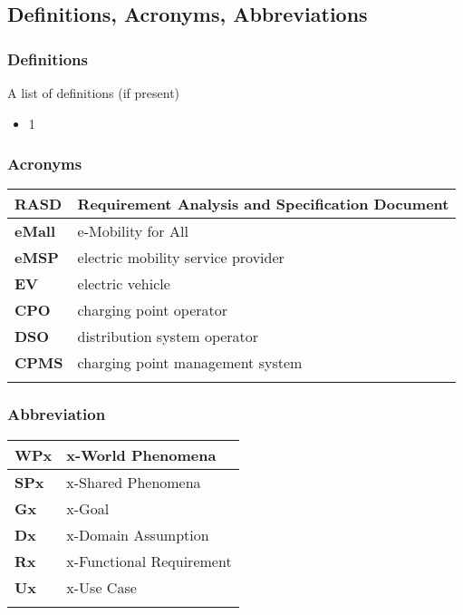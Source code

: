 \subsection{Definitions, Acronyms, Abbreviations}
\subsubsection*{Definitions}
A list of definitions (if present)
\begin{itemize}
    \item 1
\end{itemize}
\subsubsection*{Acronyms}
\begin{table}[h]
    \begin{tabular}{|l|l|}
        \toprule
        \textbf{RASD}  & Requirement Analysis and Specification Document \\ \midrule
        \textbf{eMall} & e-Mobility for All                              \\ \midrule
        \textbf{eMSP}  & electric mobility service provider              \\ \midrule
        \textbf{EV}    & electric vehicle                                \\ \midrule
        \textbf{CPO}   & charging point operator                         \\ \midrule
        \textbf{DSO}   & distribution system operator                    \\ \midrule
        \textbf{CPMS}  & charging point management system                \\ \midrule
                       &                                                 \\ \bottomrule
    \end{tabular}
\end{table}
\subsubsection*{Abbreviation}
\begin{table}[h]
    \begin{tabular}{|l|l|}
        \toprule
        \textbf{WPx}   & x-World Phenomena                               \\ \midrule
        \textbf{SPx}   & x-Shared Phenomena                              \\ \midrule
        \textbf{Gx}    & x-Goal                                          \\ \midrule
        \textbf{Dx}    & x-Domain Assumption                             \\ \midrule
        \textbf{Rx}    & x-Functional Requirement                        \\ \midrule
        \textbf{Ux}    & x-Use Case                        \\ \midrule
                      &                                                 \\ \bottomrule
    \end{tabular}
\end{table}
